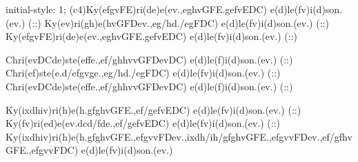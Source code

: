 initial-style: 1;
(c4)Ky(efgvFE)ri(de)e(ev.,eghvGFE.gefvEDC) e(d)le(fv)i(d)son.(ev.) (::)
Ky(ev)ri(gh)e(hvGFDev.,eg/hd./egFDC) e(d)le(fv)i(d)son.(ev.) (::)
Ky(efgvFE)ri(de)e(ev.,eghvGFE.gefvEDC) e(d)le(fv)i(d)son.(ev.) (::)

Chri(evDCde)ste(effe.,ef/ghhvvGFDevDC) e(d)le(f)i(d)son.(ev.) (::)
Chri(ef)ste(e.d/efgvge.,eg/hd./egFDC) e(d)le(fv)i(d)son.(ev.) (::)
Chri(evDCde)ste(effe.,ef/ghhvvGFDevDC) e(d)le(f)i(d)son.(ev.) (::)

Ky(ixdhiv)ri(h)e(h.gfghvGFE.,ef/gefvEDC) e(d)le(fv)i(d)son.(ev.) (::)
Ky(fv)ri(ed)e(ev.dcd/fde.,ef/gefvEDC) e(d)le(fv)i(d)son.(ev.) (::)
Ky(ixdhiv)ri(h)e(h.gfghvGFE.,efgvvFDev.,ixdh/ih/gfghvGFE.,efgvvFDev.,ef/gfhvGFE.,efgvvFDC) e(d)le(fv)i(d)son.(ev.)